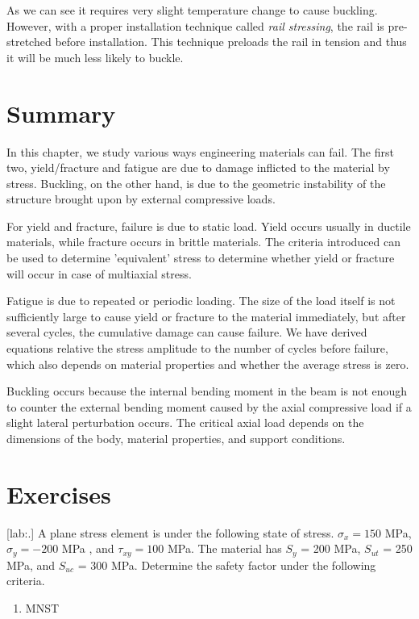 \documentclass[a4paper,openany,12pt]{book}
\begin{document}
{{As we can see it requires very slight temperature change to cause
buckling. However, with a proper installation technique called \emph{rail
stressing}, the rail is pre-stretched before installation. This
technique preloads the rail in tension and thus it will be much less
likely to buckle.

\section{Summary}
\label{summary-3}
In this chapter, we study various ways engineering materials can fail.
The first two, yield/fracture and fatigue are due to damage inflicted to
the material by stress. Buckling, on the other hand, is due to the
geometric instability of the structure brought upon by external
compressive loads.

For yield and fracture, failure is due to static load. Yield occurs
usually in ductile materials, while fracture occurs in brittle
materials. The criteria introduced can be used to determine 'equivalent'
stress to determine whether yield or fracture will occur in case of
multiaxial stress.

Fatigue is due to repeated or periodic loading. The size of the load
itself is not sufficiently large to cause yield or fracture to the
material immediately, but after several cycles, the cumulative damage
can cause failure. We have derived equations relative the stress
amplitude to the number of cycles before failure, which also depends on
material properties and whether the average stress is zero.

Buckling occurs because the internal bending moment in the beam is not
enough to counter the external bending moment caused by the axial
compressive load if a slight lateral perturbation occurs. The critical
axial load depends on the dimensions of the body, material properties,
and support conditions.

\section{Exercises}
\label{exercises-3}
[lab:.] A plane stress element is
under the following state of stress. \(\sigma_x = 150\) MPa,
\(\sigma_y = -200\) MPa , and \(\tau_{xy} = 100\) MPa. The material has
\(S_y\) = 200 MPa, \(S_{ut}\) = 250 MPa, and \(S_{uc}\) = 300 MPa. Determine
the safety factor under the following criteria.

\begin{enumerate}
\item MNST


\end{enumerate}}}
\end{document}
